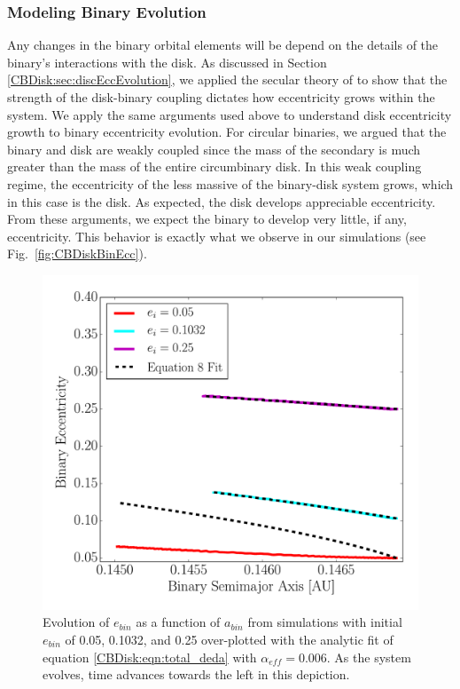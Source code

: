 
\subsubsection{Modeling Binary Evolution} \label{CBDisk:sec:ModelBinaryEvolution}

Any changes in the binary orbital elements will be depend on the
details of the binary's interactions with the disk.  As discussed in
Section \ref{CBDisk:sec:discEccEvolution}, we applied the secular theory of
\citet{Papaloizou2001} to show that the strength of the disk-binary
coupling dictates how eccentricity grows within the system.   We apply the same arguments used above to understand disk eccentricity growth to binary eccentricity evolution.  For circular binaries, we argued that the binary and disk are weakly coupled since the mass of the secondary is much greater than the mass of the entire circumbinary disk.  In this weak coupling regime, the eccentricity of the less massive of the binary-disk system grows, which in this case is the disk.  As expected, the disk develops appreciable eccentricity.  From these arguments, we expect the binary to develop very little, if any, eccentricity.  This behavior is exactly what we observe in our simulations (see Fig.~\ref{fig:CBDiskBinEcc}).

\begin{figure}
	\includegraphics[width=\columnwidth]{f8}
    \caption{Evolution of $e_{bin}$ as a
      function of $a_{bin}$ from simulations with initial $e_{bin}$ of
      0.05, 0.1032, and 0.25 over-plotted with the analytic fit of
      equation \ref{CBDisk:eqn:total_deda} with $\alpha_{eff} = 0.006$.
      As the system evolves, time advances towards the left in this
      depiction.}
    \label{fig:CBDiskFitEqn}
\end{figure}

